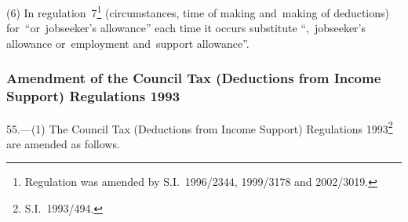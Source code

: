 \documentclass[12pt,a4paper]{article}
\begin{document}
(6) In regulation~7\footnote{Regulation was amended by S.I.~1996/2344, 1999/3178 and 2002/3019.} (circumstances, time of making and~making of deductions) for~“or~jobseeker’s allowance” each time it occurs substitute “,~jobseeker’s allowance or~employment and~support allowance”.

\subsubsection[55. Amendment of the Council Tax (Deductions from Income Support) Regulations 1993]{Amendment of the Council Tax (Deductions from Income Support) Regulations 1993}

55.---(1)  The Council Tax (Deductions from Income Support) Regulations 1993\footnote{S.I.~1993/494.} are amended as follows.
\end{document}
